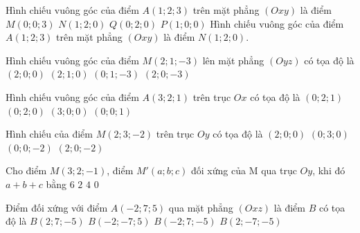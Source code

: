 \begin{ex}
	Hình chiếu vuông góc của điểm $A(1;2;3)$ trên mặt phẳng $(Oxy)$ là điểm
	\choice
	{$M(0;0;3)$}
	{\True $N(1;2;0)$}
	{$Q(0;2;0)$}
	{$P(1;0;0)$}
	\loigiai
	{
		Hình chiếu vuông góc của điểm $A(1;2;3)$ trên mặt phẳng $(Oxy)$ là điểm $N(1;2;0)$.
	}
\end{ex} 

\begin{ex}
	Hình chiếu vuông góc của điểm $M(2;1;-3)$ lên mặt phẳng $(Oyz)$ có tọa độ là
	\choice
	{$(2;0;0)$}
	{$(2;1;0)$}
	{\True $(0;1;-3)$}
	{$(2;0;-3)$}
\end{ex} 

\begin{ex}
	Hình chiếu vuông góc của điểm $A(3;2;1)$ trên trục $Ox$ có tọa độ là
	\choice
	{$(0;2;1)$}
	{$(0;2;0)$}
	{\True $(3;0;0)$}
	{$(0;0;1)$}
\end{ex} 

\begin{ex}
	Hình chiếu của điểm $M(2;3;-2)$ trên trục $Oy$ có tọa độ là
	\choice
	{$ (2;0;0) $}
	{\True $ (0;3;0) $}
	{$ (0;0;-2) $}
	{$ (2;0;-2) $}
\end{ex} 

\begin{ex}
	Cho điểm $M(3;2;-1)$, điểm $M'(a;b;c)$ đối xứng của M qua trục $Oy$, khi đó $a+b+c$ bằng
	\choice
	{$6$}
	{$2$}
	{$4$}
	{\True $0$}
\end{ex}

\begin{ex}%
	Điểm đối xứng với điểm $A(-2;7;5)$ qua mặt phẳng $(Oxz)$ là điểm $B$ có tọa độ là
	\choice
	{$B(2;7;-5)$}
	{\True$B(-2;-7;5)$}
	{$B(-2;7;-5)$}
	{$B(2;-7;-5)$}
\end{ex}

